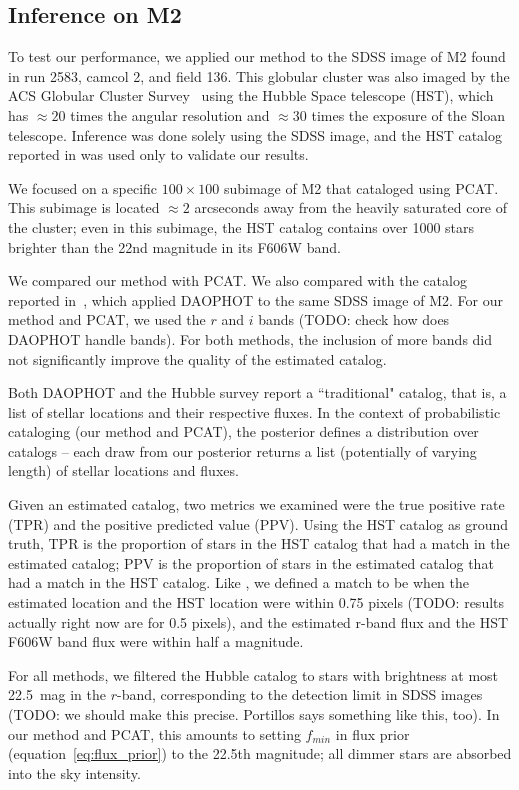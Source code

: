 \subsection{Inference on M2}
To test our performance, we applied our method to the SDSS image of M2 found in run 2583, camcol 2, and field 136.
This globular cluster was also imaged by the ACS Globular Cluster Survey~\cite{Sarajedini_2007}
using the Hubble Space telescope (HST),
which has $\approx20$ times the angular resolution and $\approx30$ times the exposure of the Sloan telescope.
Inference was done solely using the SDSS image, 
and the HST catalog reported in \cite{Sarajedini_2007} was used only to 
validate our results.

We focused on a specific $100 \times 100$ subimage of M2 that \cite{Portillo_2017, Feder_2019} cataloged using PCAT.
This subimage is located $\approx2$ arcseconds away from the heavily saturated core of the cluster;
even in this subimage, the HST catalog contains over 1000 stars brighter than the 22nd magnitude in its F606W band.

We compared our method with PCAT. We also compared with the catalog reported in~\cite{An_2008_m2}, which applied DAOPHOT to the same SDSS image of M2. 
For our method and PCAT, we used the $r$ and $i$ bands (TODO: check how does DAOPHOT handle bands). For both methods, the inclusion of more bands did not significantly improve the quality of the estimated catalog.

Both DAOPHOT and the Hubble survey report a ``traditional" catalog, that is, a list of stellar locations and their respective fluxes. In the context of probabilistic cataloging (our method and PCAT), the posterior 
defines a distribution over catalogs -- each draw from our posterior returns a list (potentially of varying length) of stellar locations and fluxes. 

Given an estimated catalog, two metrics we examined were the true positive rate (TPR) and the positive predicted value (PPV). Using the HST catalog as ground truth, TPR is the proportion of stars in the HST catalog that had a match in the estimated catalog;
PPV is the proportion of stars in the estimated catalog that had a match in the HST catalog. Like \cite{Portillo_2017, Feder_2019}, we defined a match to be when the estimated location and the HST location were within 0.75 pixels
(TODO: results actually right now are for 0.5 pixels),
and the estimated r-band flux and the HST F606W band flux were within half a magnitude.

For all methods, we filtered the Hubble catalog to stars with brightness at most 22.5~mag in the $r$-band, 
corresponding to the detection limit in SDSS images  
(TODO: we should make this precise. Portillos says something like this, too). In our method and PCAT, this amounts to setting $f_{min}$ in flux prior (equation~\eqref{eq:flux_prior})
to the 22.5th magnitude; all dimmer stars are absorbed into the sky intensity. 

